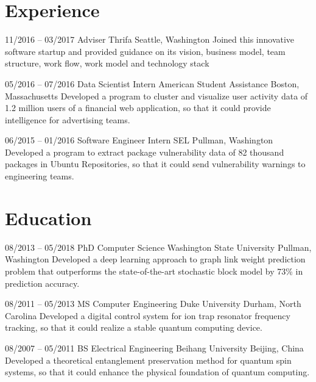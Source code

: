 \documentclass{moderncv}
\begin{document}
\makecvtitle

\section{Experience}

\cventry
{11/2016 -- 03/2017}
{Adviser}
{Thrifa}
{Seattle, Washington}
{}
{Joined this innovative software startup and provided guidance on its vision, business model, team structure, work flow, work model and technology stack}

\cventry
{05/2016 -- 07/2016}
{Data Scientist Intern}
{American Student Assistance}
{Boston, Massachusetts}
{}
{Developed a program to cluster and visualize user activity data of 1.2 million users of a financial web application, so that it could provide intelligence for advertising teams.}

\cventry
{06/2015 -- 01/2016}
{Software Engineer Intern}
{SEL}
{Pullman, Washington}
{}
{Developed a program to extract package vulnerability data of 82 thousand packages in Ubuntu Repositories, so that it could send vulnerability warnings to engineering teams.}

\section{Education}

\cventry
{08/2013 -- 05/2018}
{PhD}
{Computer Science}
{Washington State University}
{Pullman, Washington}
{Developed a deep learning approach to graph link weight prediction problem that outperforms the state-of-the-art stochastic block model by 73\% in prediction accuracy.}

\cventry
{08/2011 -- 05/2013}
{MS}
{Computer Engineering}
{Duke University}
{Durham, North Carolina}
{Developed a digital control system for ion trap resonator frequency tracking, so that it could realize a stable quantum computing device.}

\cventry
{08/2007 -- 05/2011}
{BS}
{Electrical Engineering}
{Beihang University}
{Beijing, China}
{Developed a theoretical entanglement preservation method for quantum spin systems, so that it could enhance the physical foundation of quantum computing.}

\nocite{*}


\end{document}
